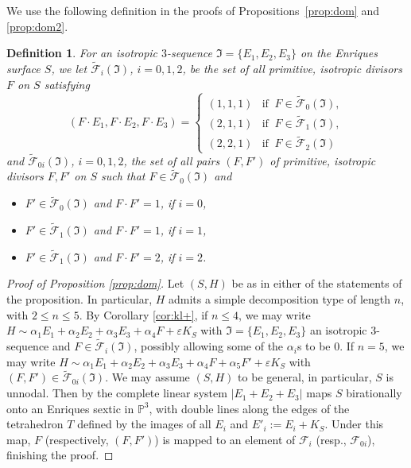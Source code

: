 \documentclass[11pt]{amsart}
\newtheorem{definition}[thm]{Definition}
\theoremstyle{definition}
\def\PP{{\mathbb P}}
\def\F{{\mathcal F}}
\begin{document}
We use the following definition in the proofs of
Propositions~\ref{prop:dom} and \ref{prop:dom2}. 

\begin{definition} \label{def:triple}
 For an isotropic $3$-sequence $\mathfrak{I}=\{E_1,E_2,E_3\}$ on the Enriques surface $S$, we let $\widetilde{\F}_i(\mathfrak{I})$, $i=0,1,2$,   be  the set of all primitive, isotropic divisors $F$ on $S$ satisfying
\[
(F \cdot E_1, F \cdot E_2, F \cdot E_3)= 
\begin{cases} (1,1,1) & \mbox{if} \; \; F \in \widetilde{\F}_0 (\mathfrak{I}), \\
              (2,1,1) & \mbox{if} \; \; F \in \widetilde{\F}_1 (\mathfrak{I}), \\
(2,2,1) & \mbox{if} \; \; F \in \widetilde{\F}_2 (\mathfrak{I})
\end{cases}
\]
and  $\widetilde{\F}_{0i} (\mathfrak{I})$, $i=0,1,2$,  the set of all pairs $(F,F')$ of primitive, isotropic divisors $F, F'$ on $S$ such that
$F \in \widetilde{\F}_0 (\mathfrak{I})$ and
\begin{itemize}
\item $F' \in \widetilde{\F}_0 (\mathfrak{I})$ and $F \cdot F'=1$, if $i=0$,
\item $F' \in \widetilde{\F}_1 (\mathfrak{I})$ and $F \cdot F'=1$, if $i=1$,
\item $F' \in \widetilde{\F}_1 (\mathfrak{I})$ and $F \cdot F'=2$, if $i=2$.
\end{itemize}
\end{definition}






 

\begin{proof}[Proof of Proposition \ref{prop:dom}]
  Let $(S,H)$ be as in either of the statements of the proposition. In
particular, $H$ admits a simple decomposition type of length $n$, with
$2 \leqslant n \leqslant 5$.  By   Corollary \ref{cor:kl+}, if $n
\leqslant 4$, we may write $H  \sim  
\alpha_1E_1+\alpha_2E_2+\alpha_3E_3+\alpha_4F+\varepsilon K_S$ with $\mathfrak
I=\{E_1, E_2, E_3\}$ an isotropic $3$-sequence and $F \in
\widetilde{\F}_i(\mathfrak I)$,
possibly allowing some of the $\alpha_i$s to be $0$.  If $n=5$, we may
write $H  \sim  
\alpha_1E_1+\alpha_2E_2+\alpha_3E_3+\alpha_4F+\alpha_5F'+\varepsilon K_S$ with $(F,F')
\in \widetilde{\F}_{0i}(\mathfrak I)$.
We may assume $(S,H)$ to be general, in particular, $S$ is
unnodal. Then by \cite[Thm. 4.6.3 and 4.7.2]{cd} the complete linear
system $|E_1+E_2+E_3|$ maps $S$ birationally onto an Enriques sextic
in $\PP^3$, with double lines along the edges of the tetrahedron $T$
defined by the images of all $E_i$ and $E'_i:=E_i+K_S$. Under this
map, $F$ (respectively, $(F,F')$) is mapped to an element of $\F_i$
(resp., $\F_{0i}$), finishing the proof.
\end{proof}
\end{document}
